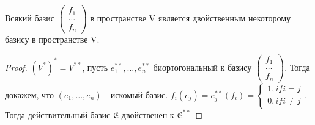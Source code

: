 \begin{corollary}
	Всякий базис \(\begin{pmatrix}
		f_1 \\ \ldots \\ f_n
	\end{pmatrix}\) в пространстве V является двойственным некоторому базису в пространстве V.
\end{corollary}
\begin{proof}
	\((V^{*})^{*} = V^{**}\), пусть \(e_1^{**}, \ldots, e_n^{**}\) биортогональный к базису \(\begin{pmatrix}
	f_1 \\ \ldots \\f_n
	\end{pmatrix}\). Тогда докажем, что \((e_1, \ldots, e_n)\) - искомый базис. \newline
	\(f_i(e_j) = e_j^{**}(f_i) = \left\{\begin{gathered}
		1, if i = j \\ 
		0, if i\ne j
	\end{gathered}\right.\). Тогда действительный базис \(\mathfrak{E}\) двойственен к \(\mathfrak{E}^{**}\)
\end{proof}

